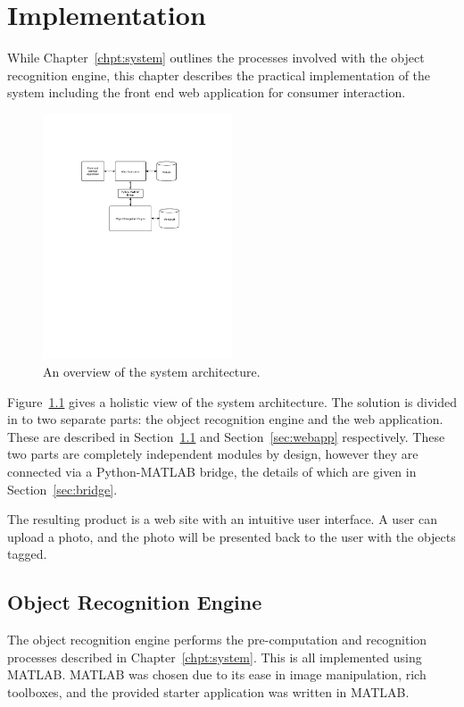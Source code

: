 \documentclass[11pt, onecolumn, a4paper, final]{report} %
\begin{document}
\chapter{Implementation}
\label{chpt:architecture}
While Chapter~\ref{chpt:system} outlines the processes involved with the object recognition engine, this chapter describes the practical implementation of the system including the front end web application for consumer interaction.

\begin{figure}[htb]
\centering 
\includegraphics[width=0.5\textwidth]{images/SystemArchitecture.pdf}
\caption{An overview of the system architecture.}
\label{fig:architecture}
\end{figure}

Figure~\ref{fig:architecture} gives a holistic view of the system architecture. The solution is divided in to two separate parts: the object recognition engine and the web application. These are described in Section~\ref{sec:engine} and Section~\ref{sec:webapp} respectively. These two parts are completely independent modules by design, however they are connected via a Python-MATLAB bridge, the details of which are given in Section~\ref{sec:bridge}.

The resulting product is a web site with an intuitive user interface. A user can upload a photo, and the photo will be presented back to the user with the objects tagged.

\section{Object Recognition Engine}
\label{sec:engine}
The object recognition engine performs the pre-computation and recognition processes described in Chapter~\ref{chpt:system}. This is all implemented using MATLAB. MATLAB was chosen due to its ease in image manipulation, rich toolboxes, and the provided starter application was written in MATLAB.
\end{document}
